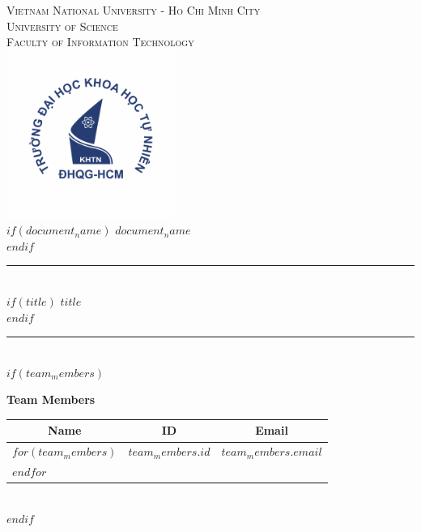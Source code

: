 \documentclass[$if(fontsize)$$fontsize$,$endif$$if(lang)$$babel-lang$,$endif$$if(papersize)$$papersize$paper,$endif$$for(classoption)$$classoption$$sep$,$endfor$]{$documentclass$}
\renewcommand{\arraystretch}{1.4}
\begin{document}
\begin{titlepage}
\begin{center}

{\Large\textsc{Vietnam National University - Ho Chi Minh City}}\\[0.2cm]
{\Large\textsc{University of Science}}\\[0.2cm]
{\Large\textsc{Faculty of Information Technology}}\\[1cm]

\includegraphics[width=5.5cm]{./title/logo.png}\\[0cm]

$if(document_name)$
{\Large\bfseries $document_name$}\\[0.7cm]
$endif$

\rule{\linewidth}{0.5mm}\\[0.6cm]
$if(title)${\huge\bfseries\color{accent} $title$}\\[0.3cm]$endif$
\rule{\linewidth}{0.5mm}\\[0.6cm]

$if(team_members)$
\begin{minipage}{\textwidth}
\begin{center}
\large\textbf{Team Members}\\[0.3cm]

\setlength{\arrayrulewidth}{0.8pt}
\setlength{\doublerulesep}{2pt}
\renewcommand{\arraystretch}{1.8}
\begin{tabular}{@{}p{4.5cm}@{}p{3cm}@{}p{5cm}@{}}
\toprule
\multicolumn{1}{c}{\textbf{Name}} & \multicolumn{1}{c}{\textbf{ID}} & \multicolumn{1}{c}{\textbf{Email}} \\
\midrule
$for(team_members)$
\multicolumn{1}{c}{$team_members.name$} & \multicolumn{1}{c}{$team_members.id$} & \multicolumn{1}{c}{$team_members.email$} \\
$endfor$
\bottomrule
\end{tabular}
\end{center}
\end{minipage}\\[0.8cm]
$endif$


\end{center}
\end{titlepage}
\end{document}
